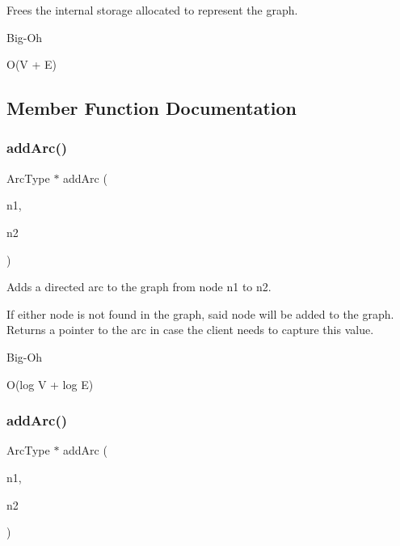 Frees the internal storage allocated to represent the graph. 

\begin{DoxyRefDesc}{Big-\/\+Oh}
\item[\mbox{\hyperlink{BigOh__BigOh000041}{Big-\/\+Oh}}]O(V + E) \end{DoxyRefDesc}


\subsection{Member Function Documentation}
\mbox{\label{classGraph_aad2e9fedd7110ae2fb6873c5e2d29941}} 
\subsubsection{\texorpdfstring{add\+Arc()}{addArc()}\hspace{0.1cm}{\footnotesize\ttfamily [1/3]}}
{\footnotesize\ttfamily Arc\+Type $\ast$ add\+Arc (\begin{DoxyParamCaption}\item[{const std\+::string \&}]{n1,  }\item[{const std\+::string \&}]{n2 }\end{DoxyParamCaption})}



Adds a directed arc to the graph from node n1 to n2. 

If either node is not found in the graph, said node will be added to the graph. Returns a pointer to the arc in case the client needs to capture this value. \begin{DoxyRefDesc}{Big-\/\+Oh}
\item[\mbox{\hyperlink{BigOh__BigOh000042}{Big-\/\+Oh}}]O(log V + log E) \end{DoxyRefDesc}
\mbox{\label{classGraph_a7280d3cd76bab82df392ba91ed5257c6}} 
\subsubsection{\texorpdfstring{add\+Arc()}{addArc()}\hspace{0.1cm}{\footnotesize\ttfamily [2/3]}}
{\footnotesize\ttfamily Arc\+Type $\ast$ add\+Arc (\begin{DoxyParamCaption}\item[{Node\+Type $\ast$}]{n1,  }\item[{Node\+Type $\ast$}]{n2 }\end{DoxyParamCaption})}



